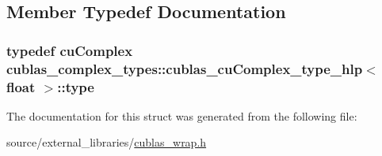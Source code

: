 \subsection{Member Typedef Documentation}
\hypertarget{structcublas__complex__types_1_1cublas__cuComplex__type__hlp_3_01float_01_4_add4b8ecc2b817f1dc6df9ba43ec67c03}{
\subsubsection[{type}]{\setlength{\rightskip}{0pt plus 5cm}typedef cu\-Complex {\bf cublas\-\_\-complex\-\_\-types\-::cublas\-\_\-cu\-Complex\-\_\-type\-\_\-hlp}$<$ float $>$\-::{\bf type}}}\label{structcublas__complex__types_1_1cublas__cuComplex__type__hlp_3_01float_01_4_add4b8ecc2b817f1dc6df9ba43ec67c03}


The documentation for this struct was generated from the following file\-:\begin{DoxyCompactItemize}
\item 
source/external\-\_\-libraries/\hyperlink{cublas__wrap_8h}{cublas\-\_\-wrap.\-h}\end{DoxyCompactItemize}
